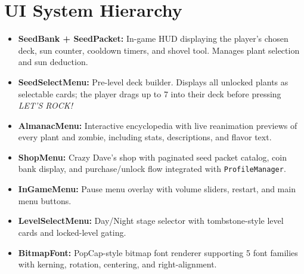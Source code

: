 \documentclass[12pt,a4paper]{article}
\begin{document}
\section{UI System Hierarchy}
\begin{center}
\end{center}
\begin{itemize}[leftmargin=2em]
    \item \textbf{SeedBank + SeedPacket:} In-game HUD displaying the player's chosen deck, sun counter, cooldown timers, and shovel tool. Manages plant selection and sun deduction.
    \item \textbf{SeedSelectMenu:} Pre-level deck builder. Displays all unlocked plants as selectable cards; the player drags up to 7 into their deck before pressing \emph{LET'S ROCK!}
    \item \textbf{AlmanacMenu:} Interactive encyclopedia with live reanimation previews of every plant and zombie, including stats, descriptions, and flavor text.
    \item \textbf{ShopMenu:} Crazy Dave's shop with paginated seed packet catalog, coin bank display, and purchase/unlock flow integrated with \texttt{ProfileManager}.
    \item \textbf{InGameMenu:} Pause menu overlay with volume sliders, restart, and main menu buttons.
    \item \textbf{LevelSelectMenu:} Day/Night stage selector with tombstone-style level cards and locked-level gating.
    \item \textbf{BitmapFont:} PopCap-style bitmap font renderer supporting 5 font families with kerning, rotation, centering, and right-alignment.
\end{itemize}
\end{document}
